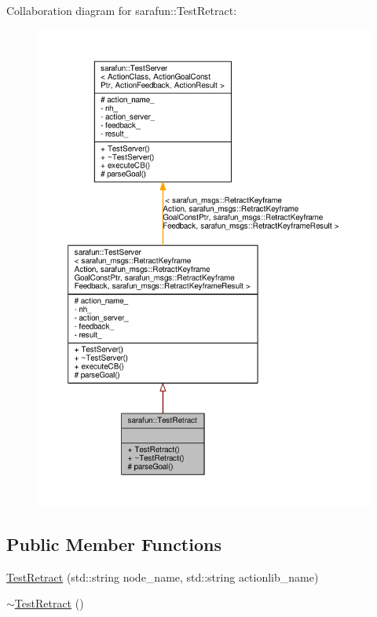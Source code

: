 Collaboration diagram for sarafun\-:\-:Test\-Retract\-:\nopagebreak
\begin{figure}[H]
\begin{center}
\leavevmode
\includegraphics[width=350pt]{da/d86/classsarafun_1_1TestRetract__coll__graph}
\end{center}
\end{figure}
\subsection*{Public Member Functions}
\begin{DoxyCompactItemize}
\item 
\hyperlink{classsarafun_1_1TestRetract_a82a06a6ab0232efbe0826ec719a05b60_a82a06a6ab0232efbe0826ec719a05b60}{Test\-Retract} (std\-::string node\-\_\-name, std\-::string actionlib\-\_\-name)
\item 
\hyperlink{classsarafun_1_1TestRetract_a726afd78008fdc6c7b6226ea56306f30_a726afd78008fdc6c7b6226ea56306f30}{$\sim$\-Test\-Retract} ()
\end{DoxyCompactItemize}
